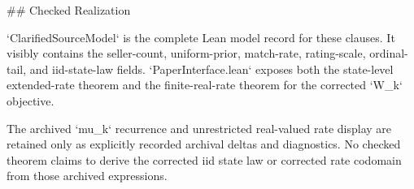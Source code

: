 \documentclass[10pt]{article}
\begin{document}
\begin{ReviewVerbatim}

## Checked Realization

`ClarifiedSourceModel` is the complete Lean model record for these clauses.
It visibly contains the seller-count, uniform-prior, match-rate, rating-scale,
ordinal-tail, and iid-state-law fields. `PaperInterface.lean` exposes both the
state-level extended-rate theorem and the finite-real-rate theorem for the
corrected `W_k` objective.

The archived `mu_k` recurrence and unrestricted real-valued rate display are
retained only as explicitly recorded archival deltas and diagnostics. No
checked theorem claims to derive the corrected iid state law or corrected rate
codomain from those archived expressions.
\end{ReviewVerbatim}
\end{document}
